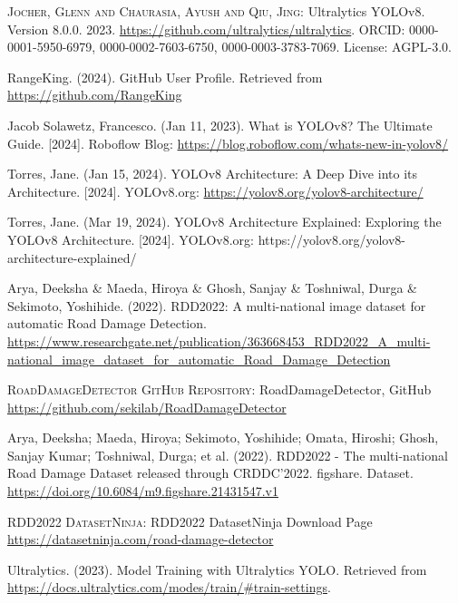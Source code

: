 \begin{thebibliography}{10}
        \textsc{Jocher, Glenn and Chaurasia, Ayush and Qiu, Jing}:
        Ultralytics YOLOv8.
        Version 8.0.0.
        2023.
        \url{https://github.com/ultralytics/ultralytics}.
        \textsc{ORCID}: 0000-0001-5950-6979, 0000-0002-7603-6750, 0000-0003-3783-7069.
        License: AGPL-3.0.

        RangeKing. (2024). GitHub User Profile.
        Retrieved from \url{https://github.com/RangeKing}

        Jacob Solawetz, Francesco. (Jan 11, 2023). What is YOLOv8? The Ultimate Guide. [2024]. Roboflow Blog: \url{https://blog.roboflow.com/whats-new-in-yolov8/}

        Torres, Jane. (Jan 15, 2024). YOLOv8 Architecture: A Deep Dive into its Architecture. [2024]. YOLOv8.org: \url{https://yolov8.org/yolov8-architecture/}

        Torres, Jane. (Mar 19, 2024). YOLOv8 Architecture Explained: Exploring the YOLOv8 Architecture. [2024]. YOLOv8.org: https://yolov8.org/yolov8-architecture-explained/

        Arya, Deeksha \& Maeda, Hiroya \& Ghosh, Sanjay \& Toshniwal, Durga \& Sekimoto, Yoshihide. (2022). RDD2022: A multi-national image dataset for automatic Road Damage Detection. 
        \url{https://www.researchgate.net/publication/363668453_RDD2022_A_multi-national_image_dataset_for_automatic_Road_Damage_Detection}

        \textsc{RoadDamageDetector GitHub Repository}:
        RoadDamageDetector, GitHub
        \url{https://github.com/sekilab/RoadDamageDetector}

        Arya, Deeksha; Maeda, Hiroya; Sekimoto, Yoshihide; Omata, Hiroshi; Ghosh, Sanjay Kumar; Toshniwal, Durga; et al. (2022). RDD2022 - The multi-national Road Damage Dataset released through CRDDC'2022. figshare. Dataset. \url{https://doi.org/10.6084/m9.figshare.21431547.v1}

        \textsc{RDD2022 DatasetNinja}:
        RDD2022 DatasetNinja Download Page
        \url{https://datasetninja.com/road-damage-detector}

        Ultralytics. (2023). Model Training with Ultralytics YOLO. Retrieved from \url{https://docs.ultralytics.com/modes/train/#train-settings}.















\end{thebibliography}
